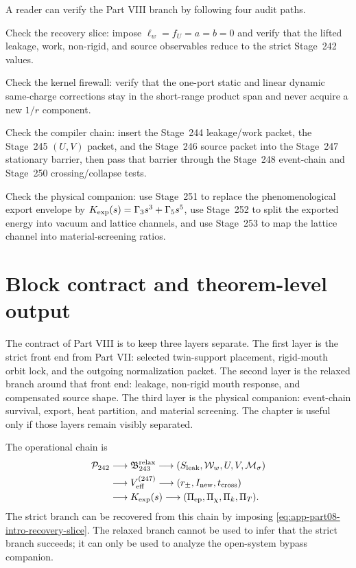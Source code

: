 A reader can verify the Part VIII branch by following four audit paths.
\begin{verificationchecklist}
  \item Check the recovery slice: impose \(\ell_w=f_U=a=b=0\) and verify that the lifted leakage, work, non-rigid, and source observables reduce to the strict Stage~242 values.
  \item Check the kernel firewall: verify that the one-port static and linear dynamic same-charge corrections stay in the short-range product span and never acquire a new \(1/r\) component.
  \item Check the compiler chain: insert the Stage~244 leakage/work packet, the Stage~245 \((U,V)\) packet, and the Stage~246 source packet into the Stage~247 stationary barrier, then pass that barrier through the Stage~248 event-chain and Stage~250 crossing/collapse tests.
  \item Check the physical companion: use Stage~251 to replace the phenomenological export envelope by \(K_{\rm exp}(s)=\Gamma_3s^3+\Gamma_5s^5\), use Stage~252 to split the exported energy into vacuum and lattice channels, and use Stage~253 to map the lattice channel into material-screening ratios.
\end{verificationchecklist}


\section{Block contract and theorem-level output}
\label{sec:app-part08-block-contract}

The contract of Part VIII is to keep three layers separate.  The first layer is the strict front end from Part VII: selected twin-support placement, rigid-mouth orbit lock, and the outgoing normalization packet.  The second layer is the relaxed branch around that front end: leakage, non-rigid mouth response, and compensated source shape.  The third layer is the physical companion: event-chain survival, export, heat partition, and material screening.  The chapter is useful only if those layers remain visibly separated.

The operational chain is
\begin{equation}
\label{eq:app-part08-operational-chain}
\begin{aligned}
\mathcal P_{242}
&\longrightarrow
\mathfrak B_{243}^{\rm relax}
\longrightarrow
(S_{\rm leak},\mathcal W_w,U,V,\mathcal M_\sigma)
\\
&\longrightarrow
V_{\rm eff}^{(247)}
\longrightarrow
(r_\pm,I_{\rm new},t_{\rm cross})
\\
&\longrightarrow
K_{\rm exp}(s)
\longrightarrow
(\Pi_{\rm ep},\Pi_\chi,\Pi_k,\Pi_T).
\end{aligned}
\end{equation}
The strict branch can be recovered from this chain by imposing \cref{eq:app-part08-intro-recovery-slice}.  The relaxed branch cannot be used to infer that the strict branch succeeds; it can only be used to analyze the open-system bypass companion.

